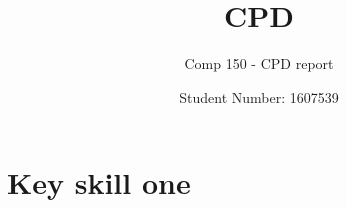 \documentclass{scrartcl}
\title{CPD}
\subtitle{Comp 150 - CPD report}
\author{Student Number: 1607539}
\begin{document}
\maketitle

\section*{Key skill one}






\end{document}
